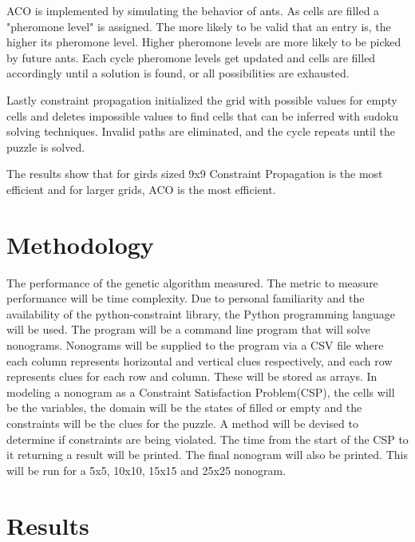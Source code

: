 \documentclass[12pt, letterpaper]{article}
\begin{document}
    ACO is implemented by simulating the behavior of ants. As cells are filled a "pheromone level" is assigned. The more likely to be valid that an entry is, the higher its pheromone level. Higher pheromone levels are more likely to be picked by future ants. Each cycle pheromone levels get updated and cells are filled accordingly until a solution is found, or all possibilities are exhausted.

    Lastly constraint propagation initialized the grid with possible values for empty cells and deletes impossible values to find cells that can be inferred with sudoku solving techniques. Invalid paths are eliminated, and the cycle repeats until the puzzle is solved.

    The results show that for girds sized 9x9 Constraint Propagation is the most efficient and for larger grids, ACO is the most efficient.

\section{Methodology}
The performance of the genetic algorithm measured. The metric to measure performance will be time complexity. Due to personal familiarity and the availability of the python-constraint \cite{pycon} library, the Python programming language will be used. The program will be a command line program that will solve nonograms. Nonograms will be supplied to the program via a CSV file where each column represents horizontal and vertical clues respectively, and each row represents clues for each row and column. These will be stored as arrays.
In modeling a nonogram as a Constraint Satisfaction Problem(CSP), the cells will be the variables, the domain will be the states of filled or empty and the constraints will be the clues for the puzzle. A method will be devised to determine if constraints are being violated. The time from the start of the CSP to it returning a result will be printed. The final nonogram will also be printed. This will be run for a 5x5, 10x10, 15x15 and 25x25 nonogram.

\section{Results}
\end{document}
